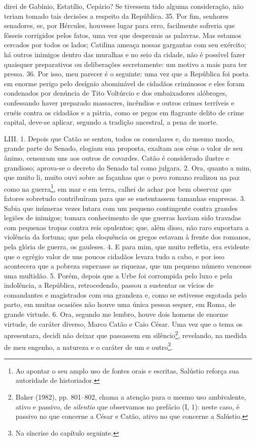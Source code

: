 direi de Gabínio, Estatílio, Cepário? Se tivessem tido alguma consideração, não
teriam tomado tais decisões a respeito da República. 35. Por fim, senhores
senadores, se, por Hércules, houvesse lugar para erro, facilmente sofreria que
fôsseis corrigidos pelos fatos, uma vez que desprezais as palavras. Mas estamos
cercados por todos os lados; Catilina ameaça nossas gargantas com seu exército;
há outros inimigos dentro das muralhas e no seio da cidade, não é possível
fazer quaisquer preparativos ou deliberações secretamente: um motivo a mais
para ter pressa. 36. Por isso, meu parecer é o seguinte: uma vez que a
República foi posta em enorme perigo pelo desígnio abominável de cidadãos
criminosos e eles foram condenados por denúncia de Tito Voltúrcio e dos
embaixadores alóbroges, confessando haver preparado massacres, incêndios e
outros crimes terríveis e cruéis contra os cidadãos e a pátria, como se pegos
em flagrante delito de crime capital, deve-se aplicar, segundo a tradição
ancestral, a pena de morte.

LIII. 1. Depois que Catão se sentou, todos os consulares e, do mesmo modo,
grande parte do Senado, elogiam sua proposta, exaltam aos céus o valor de seu
ânimo, censuram uns aos outros de covardes. Catão é considerado ilustre e
grandioso; aprova-se o decreto do Senado tal como julgara. 2. Ora, quanto a
mim, que muito li, muito ouvi sobre as façanhas que o povo romano realizou na
paz como na guerra\footnote{Ao apontar o seu amplo uso de fontes orais e
escritas, Salústio reforça sua autoridade de historiador.}, em mar e em terra,
calhei de achar por bem observar que fatores sobretudo contribuíram para que se
sustentassem tamanhas empresas. 3. Sabia que inúmeras vezes lutara com um
pequeno contingente contra grandes legiões de inimigos; tomara conhecimento de
que guerras haviam sido travadas com pequenas tropas contra reis opulentos;
que, além disso, não raro suportara a violência da fortuna; que pela eloquência
os gregos estavam à frente dos romanos, pela glória de guerra, os gauleses. 4.
E para mim, que muito refletia, era evidente que o egrégio valor de uns poucos
cidadãos levara tudo a cabo, e por isso acontecera que a pobreza superasse as
riquezas, que um pequeno número vencesse uma multidão. 5. Porém, depois que a
Urbe foi corrompida pelo luxo e pela indolência, a República, retrocedendo,
passou a sustentar os vícios de comandantes e magistrados com sua grandeza e,
como se estivesse esgotada pelo parto, em muitas ocasiões não houve uma única
pessoa sequer, em Roma, de grande virtude. 6. Ora, segundo me lembro, houve
dois homens de enorme virtude, de caráter diverso, Marco Catão e Caio César.
Uma vez que o tema os apresentara, decidi não deixar que passassem em
silêncio\footnote{Baker (1982), pp. 801--802, chama a atenção para o mesmo uso
ambivalente, ativo e passivo, de \emph{silentio} que observamos no prefácio (I,
1): neste caso, é passivo no que concerne a César e Catão, ativo no que
concerne a Salústio.}, revelando, na medida de meu engenho, a natureza e o
caráter de um e outro\footnote{Na síncrise do capítulo seguinte.}. 

